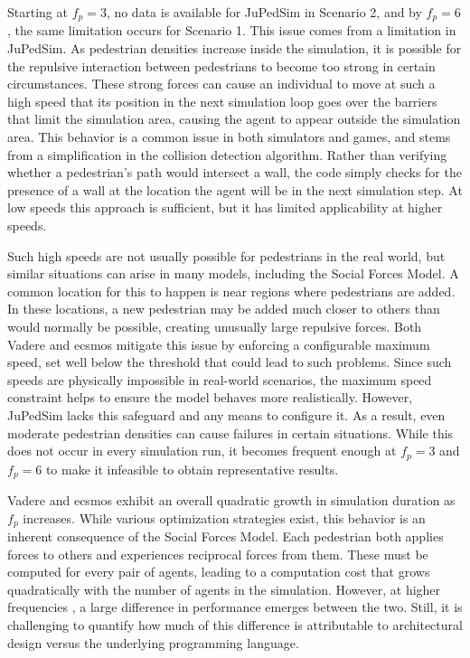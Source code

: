 \documentclass[twoside, 11pt]{article}
\begin{document}
Starting at $f_p = 3$, no data is available for JuPedSim in Scenario 2, and by $f_p = 6$, the same limitation occurs for Scenario 1. This issue comes from a limitation in JuPedSim. As pedestrian densities increase inside the simulation, it is possible for the repulsive interaction between pedestrians to become too strong in certain circumstances. These strong forces can cause an individual to move at such a high speed that its position in the next simulation loop goes over the barriers that limit the simulation area, causing the agent to appear outside the simulation area. This behavior is a common issue in both simulators and games, and stems from a simplification in the collision detection algorithm. Rather than verifying whether a pedestrian's path would intersect a wall, the code simply checks for the presence of a wall at the location the agent will be in the next simulation step. At low speeds this approach is sufficient, but it has limited applicability at higher speeds.

Such high speeds are not usually possible for pedestrians in the real world, but similar situations can arise in many models, including the Social Forces Model. A common location for this to happen is near regions where pedestrians are added. In these locations, a new pedestrian may be added much closer to others than would normally be possible, creating unusually large repulsive forces. Both Vadere and \gls{ecsmos} mitigate this issue by enforcing a configurable maximum speed, set well below the threshold that could lead to such problems. Since such speeds are physically impossible in real-world scenarios, the maximum speed constraint helps to ensure the model behaves more realistically. However, JuPedSim lacks this safeguard and any means to configure it. As a result, even moderate pedestrian densities can cause failures in certain situations. While this does not occur in every simulation run, it becomes frequent enough at $f_p = 3$ and $f_p = 6$ to make it infeasible to obtain representative results.

Vadere and \gls{ecsmos} exhibit an overall quadratic growth in simulation duration as $f_p$ increases. While various optimization strategies exist, this behavior is an inherent consequence of the Social Forces Model. Each pedestrian both applies forces to others and experiences reciprocal forces from them. These must be computed for every pair of agents, leading to a computation cost that grows quadratically with the number of agents in the simulation. However, at higher frequencies , a large difference in performance emerges between the two. Still, it is challenging to quantify how much of this difference is attributable to architectural design versus the underlying programming language.
\end{document}
